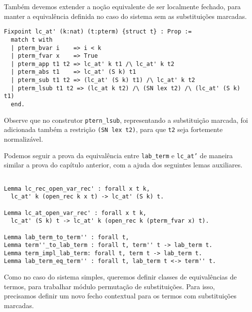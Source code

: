 Também devemos extender a noção equivalente de ser localmente fechado, para
manter a equivalência definida no caso do sistema sem as substituições marcadas.

\begin{lstlisting}[basicstyle=\small]
Fixpoint lc_at' (k:nat) (t:pterm) {struct t} : Prop :=
  match t with 
  | pterm_bvar i    => i < k
  | pterm_fvar x    => True
  | pterm_app t1 t2 => lc_at' k t1 /\ lc_at' k t2
  | pterm_abs t1    => lc_at' (S k) t1
  | pterm_sub t1 t2 => (lc_at' (S k) t1) /\ lc_at' k t2
  | pterm_lsub t1 t2 => (lc_at k t2) /\ (SN lex t2) /\ (lc_at' (S k) t1)
  end.
\end{lstlisting}

Observe que no construtor \texttt{ptern\_lsub}, representando a substituição
marcada, foi adicionada também a restrição \texttt{(SN lex t2)}, para que
\texttt{t2} seja fortemente normalizável.

Podemos seguir a prova da equivalência entre \texttt{lab\_term} e
\texttt{lc\_at'} de maneira similar a prova do capítulo anterior, com a ajuda
dos seguintes lemas auxiliares.

\pagebreak

\begin{lstlisting}[basicstyle=\small]

Lemma lc_rec_open_var_rec' : forall x t k,
  lc_at' k (open_rec k x t) -> lc_at' (S k) t.
    
Lemma lc_at_open_var_rec' : forall x t k,
  lc_at' (S k) t -> lc_at' k (open_rec k (pterm_fvar x) t).

Lemma lab_term_to_term'' : forall t,
Lemma term''_to_lab_term : forall t, term'' t -> lab_term t.
Lemma term_impl_lab_term: forall t, term t -> lab_term t.
Lemma lab_term_eq_term'' : forall t, lab_term t <-> term'' t.
\end{lstlisting}

Como no caso do sistema simples, queremos definir classes de equivalências
de termos, para trabalhar módulo permutação de substituições.
Para isso, precisamos definir um novo fecho contextual para os termos com
substituições marcadas.

